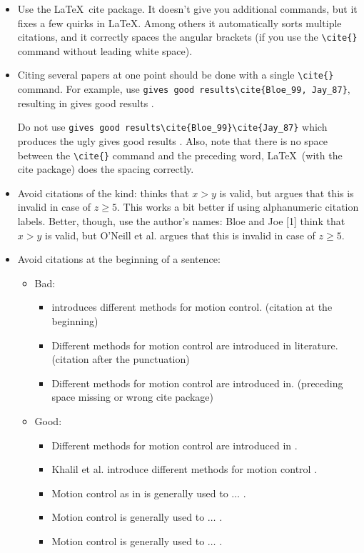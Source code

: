 \begin{itemize}
\item Use the \LaTeX~cite package. It doesn't give you additional commands, but it fixes a few quirks in \LaTeX. Among others it automatically sorts multiple citations, and it correctly spaces the angular brackets (if you use the \verb|\cite{}| command without leading white space).

\item Citing several papers at one point should be done with a single \verb|\cite{}| command. For example, use \verb|gives good results\cite{Bloe_99, Jay_87}|, resulting in gives good results \cite{Bloe_99, Jay_87}. 

Do not use \verb|gives good results\cite{Bloe_99}\cite{Jay_87}| which produces the ugly gives good results \cite{Bloe_99}\cite{Jay_87}. Also, note that there is no space between the \verb|\cite{}| command and the preceding word, \LaTeX~(with the cite package) does the spacing correctly.

\item Avoid citations of the kind: \cite{Bloe_99} thinks that $x>y$ is valid, but \cite{ONeill_2000} argues that this is invalid in case of $z\geq5$. This works a bit better if using alphanumeric citation labels. Better, though, use the author's names: Bloe and Joe [1] think that $x>y$ is valid, but O'Neill et al. \cite{ONeill_2000} argues that this is invalid in case of $z\geq5$. 

\item Avoid citations at the beginning of a sentence:
	\begin{itemize}
		\item Bad:
		\begin{itemize}
			\item \cite{Bloe_99} introduces different methods for motion control. (citation at the beginning)
			\item Different methods for motion control are introduced in literature. \cite{Bloe_99} (citation after the punctuation)
			\item Different methods for motion control are introduced in\cite{Bloe_99}. (preceding space missing or wrong cite package)
		\end{itemize}
		\item	Good: 	 
		\begin{itemize}
			\item Different methods for motion control are introduced in \cite{Bloe_99}.
			\item Khalil et al. introduce different methods for motion control \cite{Bloe_99}. 
			\item Motion control as in \cite{Bloe_99} is generally used to $\ldots$ .
			\item Motion control \cite{Bloe_99} is generally used to $\ldots$ .
			\item Motion control is generally used to $\ldots$ \cite{Bloe_99}.
		\end{itemize}
	\end{itemize}



\end{itemize}

